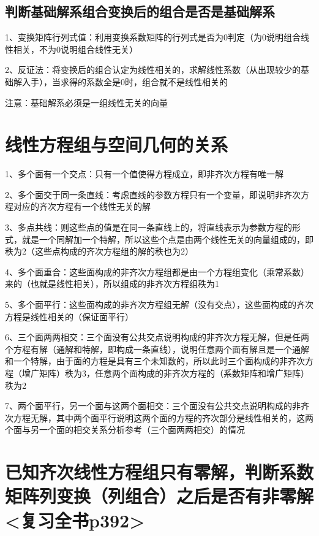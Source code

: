 \subsection{判断基础解系组合变换后的组合是否是基础解系}

1、变换矩阵行列式值：利用变换系数矩阵的行列式是否为0判定（为0说明组合线性相关，不为0说明组合线性无关）

2、反证法：将变换后的组合认定为线性相关的，求解线性系数（从出现较少的基础解入手），当求得的系数全是0时，组合就不是线性相关的

注意：基础解系必须是一组线性无关的向量

\section{线性方程组与空间几何的关系}

1、多个面有一个交点：只有一个值使得方程成立，即非齐次方程有唯一解

2、多个面交于同一条直线：考虑直线的参数方程只有一个变量，即说明非齐次方程对应的齐次方程有一个线性无关的解

3、多点共线：则这些点的值是在同一条直线上的，将直线表示为参数方程的形式，就是一个同解加一个特解，所以这些个点是由两个线性无关的向量组成的，即秩为2（这些点构成的齐次方程组的解的秩也为2）

4、多个面重合：这些面构成的非齐次方程组都是由一个方程组变化（乘常系数）来的（也就是线性相关），所以组成的非齐次方程组秩为1

5、多个面平行：这些面构成的非齐次方程组无解（没有交点），这些面构成的齐次方程是线性相关的（保证面平行）

6、三个面两两相交：三个面没有公共交点说明构成的非齐次方程无解，但是任两个方程有解（通解和特解，即构成一条直线），说明任意两个面有解且是一个通解和一个特解，由于面的方程是具有三个未知数的，所以此时三个面构成的非齐次方程（增广矩阵）秩为3，任意两个面构成的非齐次方程的（系数矩阵和增广矩阵）秩为2

7、两个面平行，另一个面与这两个面相交：三个面没有公共交点说明构成的非齐次方程无解，其中两个面平行说明这两个面的方程的齐次部分是线性相关的，这两个面与另一个面的相交关系分析参考（三个面两两相交）的情况

\section{已知齐次线性方程组只有零解，判断系数矩阵列变换（列组合）之后是否有非零解<复习全书p392>}

